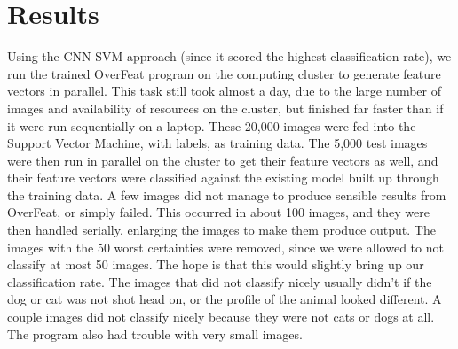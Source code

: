 \documentclass[12pt]{article}
\begin{document}
\section{Results}
Using the CNN-SVM approach (since it scored the highest classification rate), we run the trained OverFeat program on the computing cluster to generate feature vectors in parallel. This task still took almost a day, due to the large number of images and availability of resources on the cluster, but finished far faster than if it were run sequentially on a laptop. These 20,000 images were fed into the Support Vector Machine, with labels, as training data. The 5,000 test images were then run in parallel on the cluster to get their feature vectors as well, and their feature vectors were classified against the existing model built up through the training data. A few images did not manage to produce sensible results from OverFeat, or simply failed. This occurred in about 100 images, and they were then handled serially, enlarging the images to make them produce output. The images with the 50 worst certainties were removed, since we were allowed to not classify at most 50 images. The hope is that this would slightly bring up our classification rate. The images that did not classify nicely usually didn't if the dog or cat was not shot head on, or the profile of the animal looked different. A couple images did not classify nicely because they were not cats or dogs at all. The program also had trouble with very small images.
\end{document}
